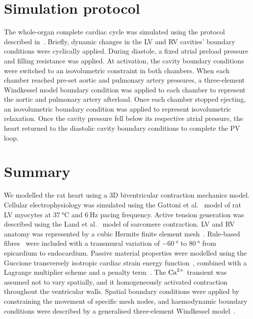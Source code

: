 %
%
%
\section{Simulation protocol}\label{sec:ch2simulationprotocol}
The whole-organ complete cardiac cycle was simulated using the protocol described in~\cite{Land:2012, Land:2012*a, Land:2015}. Briefly, dynamic changes in the LV and RV cavities' boundary conditions were cyclically applied. During diastole, a fixed atrial preload pressure and filling resistance was applied. At activation, the cavity boundary conditions were switched to an isovolumetric constraint in both chambers. When each chamber reached pre-set aortic and pulmonary artery pressures, a three-element Windkessel model boundary condition was applied to each chamber to represent the aortic and pulmonary artery afterload. Once each chamber stopped ejecting, an isovolumetric boundary condition was applied to represent isovolumetric relaxation. Once the cavity pressure fell below its respective atrial pressure, the heart returned to the diastolic cavity boundary conditions to complete the PV loop.


%
%
%
\section{Summary}\label{sec:ch2summary}
We modelled the rat heart using a $3$D biventricular contraction mechanics model. Cellular electrophysiology was simulated using the Gattoni et al.~\cite{Gattoni:2016} model of rat LV myocytes at $\SI{37}{\celsius}$ and $\SI{6}{\hertz}$ pacing frequency. Active tension generation was described using the Land et al.~\cite{Land:2012*a} model of sarcomere contraction. LV and RV anatomy was represented by a cubic Hermite finite element mesh~\cite{Lamata:2011}. Rule-based fibres~\cite{Bayer:2012} were included with a transmural variation of $\SI{-60}{\degree}$ to $\SI{80}{\degree}$ from epicardium to endocardium. Passive material properties were modelled using the Guccione transversely isotropic cardiac strain energy function~\cite{Guccione:1991}, combined with a Lagrange multiplier scheme and a penalty term~\cite{Land:2012*a, Land:2015*b}. The $\textrm{Ca}^{2+}$ transient was assumed not to vary spatially, and it homogeneously activated contraction throughout the ventricular walls. Spatial boundary conditions were applied by constraining the movement of specific mesh nodes, and haemodynamic boundary conditions were described by a generalised three-element Windkessel model~\cite{Westerhof:1991}.